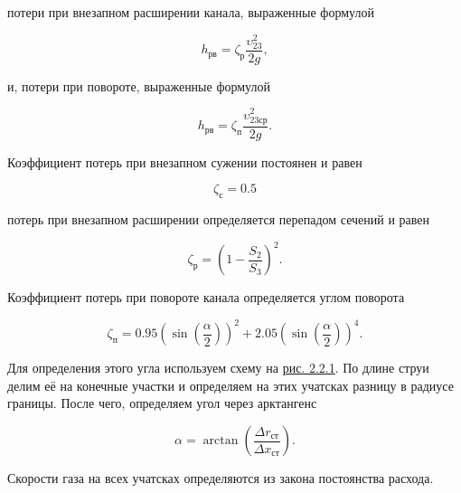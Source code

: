 потери при внезапном расширении канала, выраженные формулой

\begin{equation}
    \label{eqn:ExpansionLosses}
    h_\text{рв}=\zeta_\text{р} \dfrac{\upsilon_{23}^2}{2g},
\end{equation}

и, потери при повороте, выраженные формулой

\begin{equation}
    \label{eqn:RotationLosses}
    h_\text{рв}=\zeta_\text{п} \dfrac{\upsilon_{23\text{ср}}^2}{2g}.
\end{equation}

Коэффициент потерь при внезапном сужении постоянен и равен

\begin{equation}
    \label{eqn:ConstrictionLossesCoef}
    \zeta_\text{с} = 0.5
\end{equation}

потерь при внезапном расширении определяется перепадом сечений и равен

\begin{equation}
    \label{eqn:ExpansionLossesCoef}
    \zeta_\text{р}=(1-\dfrac{S_{2}}{S_{3}})^2.
\end{equation}

Коэффициент потерь при повороте канала определяется углом поворота

\begin{equation}
    \label{eqn:RotationLossesCoef}
    \zeta_\text{п}=0.95 (\sin(\dfrac{\alpha}{2}))^2 + 2.05(\sin(\dfrac{\alpha}{2}))^4.
\end{equation}

Для определения этого угла используем схему на \hyperref[fig:LossesScheme]{рис. 2.2.1}.
По длине струи делим её на конечные участки и определяем на этих учатсках разницу в радиусе границы.
После чего, определяем угол через арктангенс

\begin{equation}
    \label{eqn:RotationLossesCoef}
    \alpha= \arctan (\dfrac{\varDelta r_\text{ст}}{\varDelta x_\text{ст}}).
\end{equation}

Скорости газа на всех учатсках определяются из закона постоянства расхода.

